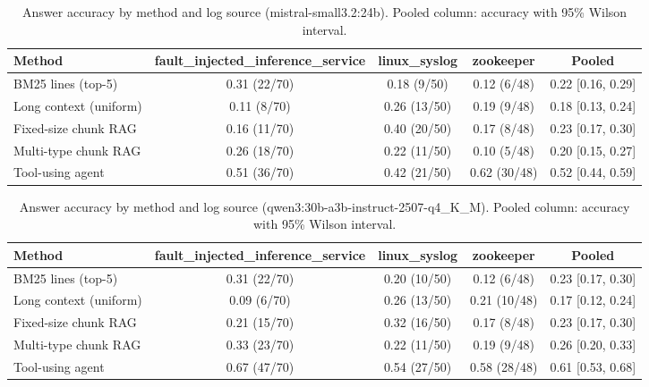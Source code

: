 \begin{table}[t]
\centering
\caption{Answer accuracy by method and log source (mistral-small3.2:24b). Pooled column: accuracy with 95\% Wilson interval.}
\label{tab:main_comparison__mistral_small_3_2_24b}
\begin{tabular}{@{}lcccc@{}}
\toprule
Method & fault\_injected\_inference\_service & linux\_syslog & zookeeper & Pooled \\
\midrule
BM25 lines (top-5) & 0.31 (22/70) & 0.18 (9/50) & 0.12 (6/48) & 0.22 [0.16, 0.29] \\
Long context (uniform) & 0.11 (8/70) & 0.26 (13/50) & 0.19 (9/48) & 0.18 [0.13, 0.24] \\
Fixed-size chunk RAG & 0.16 (11/70) & 0.40 (20/50) & 0.17 (8/48) & 0.23 [0.17, 0.30] \\
Multi-type chunk RAG & 0.26 (18/70) & 0.22 (11/50) & 0.10 (5/48) & 0.20 [0.15, 0.27] \\
Tool-using agent & 0.51 (36/70) & 0.42 (21/50) & 0.62 (30/48) & 0.52 [0.44, 0.59] \\
\bottomrule
\end{tabular}
\end{table}

\begin{table}[t]
\centering
\caption{Answer accuracy by method and log source (qwen3:30b-a3b-instruct-2507-q4_K_M). Pooled column: accuracy with 95\% Wilson interval.}
\label{tab:main_comparison__qwen3_30b_a3b_instruct}
\begin{tabular}{@{}lcccc@{}}
\toprule
Method & fault\_injected\_inference\_service & linux\_syslog & zookeeper & Pooled \\
\midrule
BM25 lines (top-5) & 0.31 (22/70) & 0.20 (10/50) & 0.12 (6/48) & 0.23 [0.17, 0.30] \\
Long context (uniform) & 0.09 (6/70) & 0.26 (13/50) & 0.21 (10/48) & 0.17 [0.12, 0.24] \\
Fixed-size chunk RAG & 0.21 (15/70) & 0.32 (16/50) & 0.17 (8/48) & 0.23 [0.17, 0.30] \\
Multi-type chunk RAG & 0.33 (23/70) & 0.22 (11/50) & 0.19 (9/48) & 0.26 [0.20, 0.33] \\
Tool-using agent & 0.67 (47/70) & 0.54 (27/50) & 0.58 (28/48) & 0.61 [0.53, 0.68] \\
\bottomrule
\end{tabular}
\end{table}

